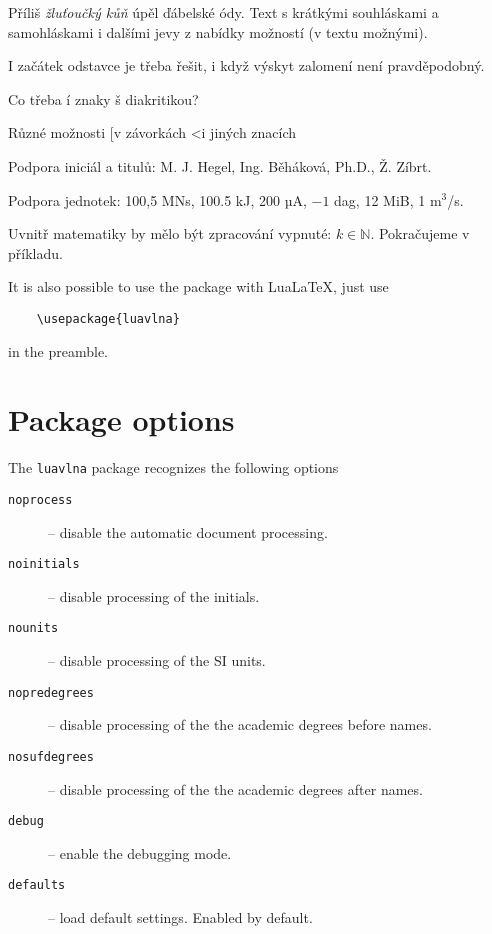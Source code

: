 \documentclass[12pt]{ltxdoc}
\begin{document}

\noindent
\begin{minipage}{3in}
\preventsingledebugon
{}
Příliš \textit{žluťoučký kůň} úpěl ďábelské ódy. 
Text s krátkými souhláskami a samohláskami i dalšími jevy z nabídky možností (v textu možnými). 

I začátek odstavce je třeba řešit, i když výskyt zalomení není pravděpodobný.

Co třeba í znaky š diakritikou?

Různé možnosti [v závorkách \textless i jiných znacích

Podpora iniciál a titulů: M. J. Hegel, Ing. Běháková, Ph.D., Ž. Zíbrt.

Podpora jednotek: 100,5 MN\cdot{}s, 100.5 kJ, 200 µA, $-1$ dag, 12 MiB, 1 m$^3$/s.

Uvnitř matematiky by mělo být zpracování vypnuté:  $k \in \mathbb N$. Pokračujeme v příkladu.

\preventsingledebugoff
\end{minipage}

\bigskip
It is also possible to use the package with Lua\LaTeX, just use

\begin{verbatim}
	\usepackage{luavlna}
\end{verbatim}

in the preamble.

\section{Package options}
The \verb|luavlna| package recognizes the following options

\begin{description}
  \item[\texttt{noprocess}] -- disable the automatic document processing.
  \item[\texttt{noinitials}] -- disable processing of the initials.
  \item[\texttt{nounits}] -- disable processing of the SI units.
  \item[\texttt{nopredegrees}] -- disable processing of the the academic degrees before names.
  \item[\texttt{nosufdegrees}] -- disable processing of the the academic degrees after names.
  \item[\texttt{debug}] -- enable the debugging mode.
  \item[\texttt{defaults}] -- load default settings. Enabled by default.
\end{description}
\end{document}
